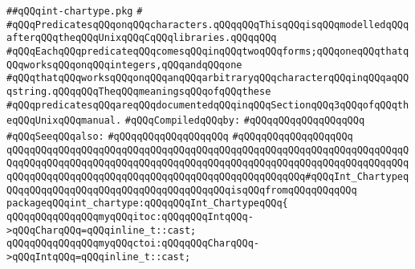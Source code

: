 \label{src/lib/std/src/int-chartype.pkg}
\verb|##qQQqint-chartype.pkg|\newline
\verb|#|\newline
\verb|#qQQqPredicatesqQQqonqQQqcharacters.qQQqqQQqThisqQQqisqQQqmodelledqQQqafterqQQqtheqQQqUnixqQQqCqQQqlibraries.qQQqqQQq|\newline
\verb|#qQQqEachqQQqpredicateqQQqcomesqQQqinqQQqtwoqQQqforms;qQQqoneqQQqthatqQQqworksqQQqonqQQqintegers,qQQqandqQQqone|\newline
\verb|#qQQqthatqQQqworksqQQqonqQQqanqQQqarbitraryqQQqcharacterqQQqinqQQqaqQQqstring.qQQqqQQqTheqQQqmeaningsqQQqofqQQqthese|\newline
\verb|#qQQqpredicatesqQQqareqQQqdocumentedqQQqinqQQqSectionqQQq3qQQqofqQQqtheqQQqUnixqQQqmanual.|\newline
\newline
\verb|#qQQqCompiledqQQqby:|\newline
\verb|#qQQqqQQqqQQqqQQqqQQq|\newline
\newline
\verb|#qQQqSeeqQQqalso:|\newline
\verb|#qQQqqQQqqQQqqQQqqQQq|\newline
\verb|#qQQqqQQqqQQqqQQqqQQq|\newline
\newline
\newline
\newline
\verb|qQQqqQQqqQQqqQQqqQQqqQQqqQQqqQQqqQQqqQQqqQQqqQQqqQQqqQQqqQQqqQQqqQQqqQQqqQQqqQQqqQQqqQQqqQQqqQQqqQQqqQQqqQQqqQQqqQQqqQQqqQQqqQQqqQQqqQQqqQQqqQQqqQQqqQQqqQQqqQQqqQQqqQQqqQQqqQQqqQQqqQQqqQQqqQQq#qQQqInt_ChartypeqQQqqQQqqQQqqQQqqQQqqQQqqQQqqQQqqQQqqQQqisqQQqfromqQQqqQQqqQQq|\newline
\newline
\verb|packageqQQqint_chartype:qQQqqQQqInt_ChartypeqQQq{|\newline
\newline
\newline
\verb|qQQqqQQqqQQqqQQqmyqQQqitoc:qQQqqQQqIntqQQq->qQQqCharqQQq=qQQqinline_t::cast;|\newline
\verb|qQQqqQQqqQQqqQQqmyqQQqctoi:qQQqqQQqCharqQQq->qQQqIntqQQq=qQQqinline_t::cast;|\newline
